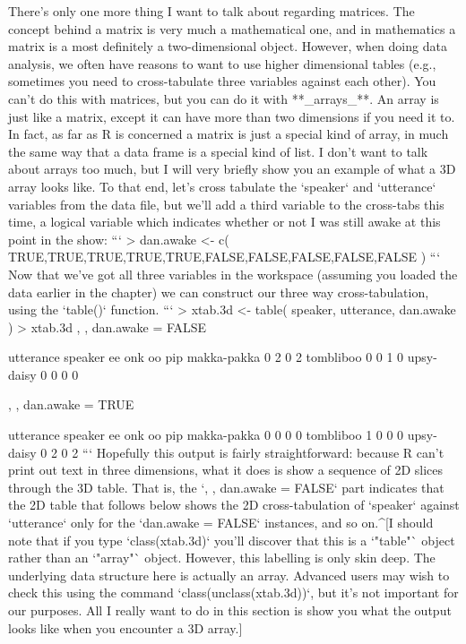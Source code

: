 There's only one more thing I want to talk about regarding matrices. The concept behind a matrix is very much a mathematical one, and in mathematics a matrix is a most definitely a two-dimensional object. However, when doing data analysis, we often have reasons to want to use higher dimensional tables (e.g., sometimes you need to cross-tabulate three variables against each other). You can't do this with matrices, but you can do it with **_arrays_**. An array is just like a matrix, except it can have more than two dimensions if you need it to. In fact, as far as R is concerned a matrix is just a special kind of array, in much the same way that a data frame is a special kind of list. I don't want to talk about arrays too much, but I will very briefly show you an example of what a 3D array looks like. To that end, let's cross tabulate the `speaker` and `utterance` variables from the  data file, but we'll add a third variable to the cross-tabs this time, a logical variable which indicates whether or not I was still awake at this point in the show:
```
> dan.awake <- c( TRUE,TRUE,TRUE,TRUE,TRUE,FALSE,FALSE,FALSE,FALSE,FALSE )
```
Now that we've got all three variables in the workspace (assuming you loaded the  data earlier in the chapter) we can construct our three way cross-tabulation, using the `table()` function. 
```
> xtab.3d <- table( speaker, utterance, dan.awake )
> xtab.3d
, , dan.awake = FALSE

             utterance
speaker       ee onk oo pip
  makka-pakka  0   2  0   2
  tombliboo    0   0  1   0
  upsy-daisy   0   0  0   0

, , dan.awake = TRUE

             utterance
speaker       ee onk oo pip
  makka-pakka  0   0  0   0
  tombliboo    1   0  0   0
  upsy-daisy   0   2  0   2
```
Hopefully this output is fairly straightforward: because R can't print out text in three dimensions, what it does is show a sequence of 2D slices through the 3D table. That is, the `, , dan.awake = FALSE` part indicates that the 2D table that follows below shows the 2D cross-tabulation of `speaker` against `utterance` only for the `dan.awake = FALSE` instances, and so on.^[I should note that if you type `class(xtab.3d)` you'll discover that this is a `"table"` object rather than an `"array"` object. However, this labelling is only skin deep. The underlying data structure here is actually an array. Advanced users may wish to check this using the command `class(unclass(xtab.3d))`, but it's not important for our purposes. All I really want to do in this section is show you what the output looks like when you encounter a 3D array.]


